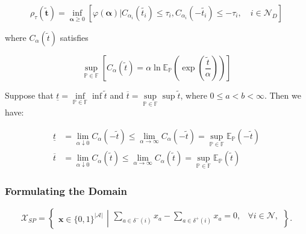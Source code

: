 \begin{equation}
\label{def:lateness_index}
\rho_\tau(\tilde{\mathbf{t}})= \inf \limits_{\mathbf{\alpha} \geq 0} \left[\varphi(\mathbf{\alpha}) | C_{\alpha_i}(\tilde{t_i}) \leq \tau_i, C_{\alpha_i}(-\tilde{t_i}) \leq -\tau_i,  \quad i \in \mathcal{N}_D\right]
\end{equation}

where $C_{\alpha}(\tilde{t})$ satisfies

\begin{equation}
\label{def:lateness_index2}
\sup \limits_{\mathbb{P} \in \mathbb{F}} \left[ C_{\alpha}(\tilde{t})= \alpha \ln \mathbb{E}_{\mathbb{P}} \left( \exp \left( \frac{\tilde{t}}{\alpha}\right)\right) \right]
\end{equation}

Suppose that $\underline{t} = \inf \limits_{\mathbb{P} \in \mathbb{F}} \inf \tilde{t}$ and $\overline{t} = \sup \limits_{\mathbb{P} \in \mathbb{F}} \sup \tilde{t}$, where $0 \leq a <b<\infty$. Then we have:

\begin{align}
\underline{t} &= \lim \limits_{\alpha \downarrow 0} C_{\alpha}(-\tilde{t}) \leq \lim \limits_{\alpha \rightarrow \infty} C_{\alpha}(-\tilde{t}) = \sup \limits_{\mathbb{P} \in \mathbb{F}} \mathbb{E}_{\mathbb{P}}(-\tilde{t})\\
\overline{t} &= \lim \limits_{\alpha \downarrow 0} C_{\alpha}(\tilde{t}) \leq \lim \limits_{\alpha \rightarrow \infty} C_{\alpha}(\tilde{t}) = \sup \limits_{\mathbb{P} \in \mathbb{F}} \mathbb{E}_{\mathbb{P}}(\tilde{t})
\end{align}

\subsubsection{Formulating the Domain}


\begin{equation}
\label{def:domain_xsp}
\mathcal{X}_{SP} = \left\{
\left. \begin{array}{l} \mathbf{x} \in \{0,1\}^{|\mathcal{A}|}  \end{array} \right.  \left\vert
\begin{array}{ll}
\sum \limits_{a \in \delta^-(i)} x_a - \sum \limits_{a \in \delta^+(i)} x_a= 0, & \forall i \in \mathcal{N}, 
\end{array}\right. \right\}.
\end{equation}

